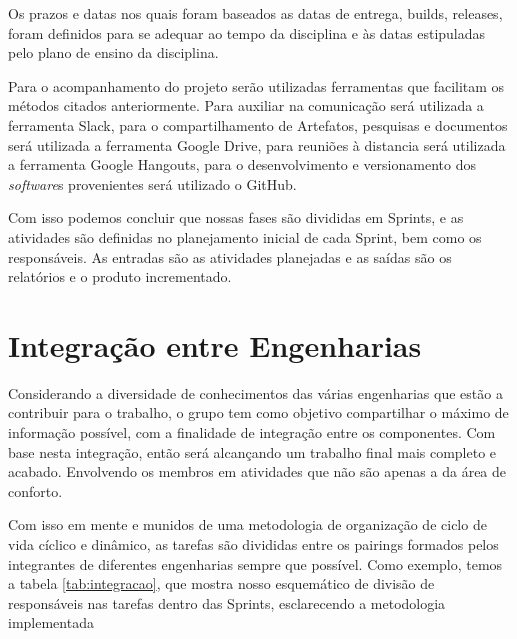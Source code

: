 Os prazos e datas nos quais foram baseados as datas de entrega, builds, releases, foram definidos para se adequar ao tempo da disciplina e às datas estipuladas pelo plano de ensino da disciplina.

Para o acompanhamento do projeto serão utilizadas ferramentas que facilitam os métodos citados anteriormente. Para auxiliar na comunicação será utilizada a ferramenta Slack, para o compartilhamento de Artefatos, pesquisas e documentos será utilizada a ferramenta Google Drive, para reuniões à distancia será utilizada a ferramenta Google Hangouts, para o desenvolvimento  e versionamento dos \textit{software}s provenientes será utilizado o GitHub.

Com isso podemos concluir que nossas fases são divididas em Sprints, e as atividades são definidas no planejamento inicial de cada Sprint, bem como os responsáveis. As entradas são as atividades planejadas e as saídas são os relatórios e o produto incrementado.

\section{Integração entre Engenharias}

Considerando a diversidade de conhecimentos das várias engenharias que estão a contribuir para o trabalho, o grupo tem como objetivo  compartilhar o máximo de informação possível, com a finalidade de integração entre os componentes. Com base nesta integração, então será alcançando um trabalho final mais completo e acabado. Envolvendo os membros em atividades que não são apenas a da área de conforto.

Com isso em mente e munidos de uma metodologia de organização de ciclo de vida cíclico e dinâmico, as tarefas são divididas entre os pairings formados pelos integrantes de diferentes engenharias sempre que possível. Como exemplo, temos a tabela \ref{tab:integracao}, que mostra nosso esquemático de divisão de responsáveis nas tarefas dentro das Sprints, esclarecendo a metodologia implementada

